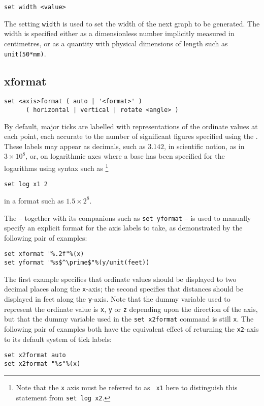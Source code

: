 \begin{verbatim}
set width <value>
\end{verbatim}

The setting {\tt width} is used to set the width of the next graph to be
generated. The width is specified either as a dimensionless number
implicitly measured in centimetres, or as a quantity with physical dimensions
of length such as {\tt unit(50*mm)}.


\subsection{xformat}

\begin{verbatim}
set <axis>format ( auto | '<format>' )
      ( horizontal | vertical | rotate <angle> )
\end{verbatim}

By default, major ticks are labelled with representations of the ordinate
values at each point, each accurate to the number of significant figures
specified using the . These labels may appear as
decimals, such as $3.142$, in scientific notion, as in $3\times10^8$, or, on
logarithmic axes where a base has been specified for the logarithms using
syntax such as \footnote{Note that the {\tt x} axis must be referred to as {\tt
x1} here to distinguish this statement from {\tt set log x2}.}
\begin{verbatim}
set log x1 2
\end{verbatim}
in a format such as $1.5\times2^8$.

The  -- together with its companions such as {\tt set
yformat} -- is used to manually specify an explicit format for the axis labels
to take, as demonstrated by the following pair of examples:
\begin{verbatim}
set xformat "%.2f"%(x)
set yformat "%s$^\prime$"%(y/unit(feet))
\end{verbatim}
The first example specifies that ordinate values should be displayed to two
decimal places along the {\tt x}-axis; the second specifies that distances should
be displayed in feet along the {\tt y}-axis. Note that the dummy variable used to
represent the ordinate value is {\tt x}, {\tt y} or {\tt z} depending upon the
direction of the axis, but that the dummy variable used in the {\tt set
x2format} command is still {\tt x}. The following pair of examples both have
the equivalent effect of returning the {\tt x2}-axis to its default system of
tick labels:
\begin{verbatim}
set x2format auto
set x2format "%s"%(x)
\end{verbatim}

